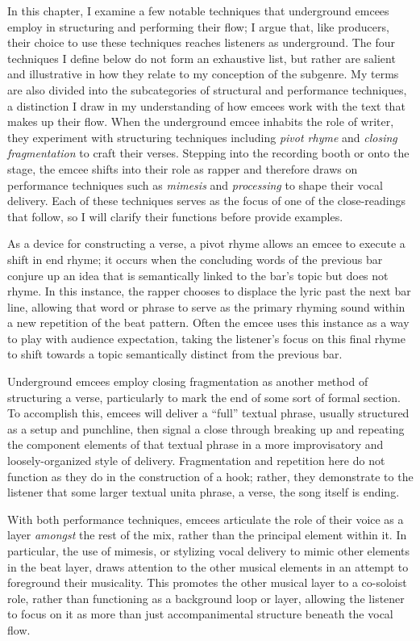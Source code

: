 In this chapter, I examine a few notable techniques that underground emcees employ 
in structuring and performing their flow; I argue that, like producers, their choice
to use these techniques reaches listeners as underground. The four techniques I define
below do not form an exhaustive list, but rather are salient and illustrative in how 
they relate to my conception of the subgenre. My terms are also  divided into the 
subcategories of structural and performance techniques, a distinction I draw in my 
understanding of how emcees work with the text that makes up their flow. When the 
underground emcee inhabits the role of writer, they experiment with structuring 
techniques including \emph{pivot rhyme} and \emph{closing fragmentation} to craft 
their verses. Stepping into the recording booth or onto the stage, the emcee shifts
into their role as rapper and therefore draws on performance techniques such as 
\emph{mimesis} and \emph{processing} to shape their vocal delivery. Each of these 
techniques serves as the focus of one of the close-readings that follow, so I will
clarify their functions before provide examples.

As a device for constructing a verse, a pivot rhyme allows an emcee to execute a shift 
in end rhyme; it occurs when the concluding words of the previous bar conjure up an idea
that is semantically linked  to the bar's topic but does not rhyme. In this instance, the
rapper chooses to displace the lyric past the next bar line, allowing that word or phrase 
to serve as the primary rhyming sound within a new repetition of the beat pattern. Often 
the emcee uses this instance as a way to play with audience expectation, taking the listener's
focus on this final rhyme to shift towards a topic semantically distinct from the previous bar.

Underground emcees employ closing fragmentation as another method of structuring a verse, 
particularly to mark the end of some sort of formal section. To accomplish this, emcees will
deliver a ``full'' textual phrase, usually structured as a setup and punchline, then signal 
a close through breaking up and repeating the component elements of that textual phrase in a 
more improvisatory and loosely-organized style of delivery. Fragmentation and repetition here 
do not function as they do in the construction of a hook; rather, they demonstrate to the 
listener that some larger textual unit\textemdash a phrase, a verse, the song itself\textemdash
is ending.

With both performance techniques, emcees articulate the role of their voice as a layer
\emph{amongst} the rest of the mix, rather than the principal element within it. In particular,
the use of mimesis, or stylizing vocal delivery to mimic other elements in the beat layer, 
draws attention to the other musical elements in an attempt to foreground their musicality.
This promotes the other musical layer to a co-soloist role, rather than functioning as a
background loop or layer, allowing the listener to focus on it as more than just 
accompanimental structure beneath the vocal flow.

